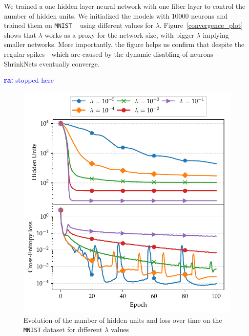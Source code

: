 \documentclass[sigconf]{acmart}
\newcommand{\ra}[1]{\textcolor{blue}{{\bf ra:} #1}}
\newcommand{\gl}[1]{\textcolor{violet}{{\bf Gl:} #1}}
\begin{document}
We trained a one hidden layer
neural network with one filter layer to control the number of hidden units. We
initialized the models with $10000$ neurons and trained them on \texttt{MNIST}
~\cite{Lecun1998} using different values for $\lambda$.
Figure~\autoref{convergence_plot} shows that
$\lambda$ works as a proxy for the network size,
with bigger $\lambda$ implying smaller
networks. More importantly, the figure helps us confirm that despite the regular
spikes---which are caused by the dynamic disabling of neurons---ShrinkNets
eventually converge.

\ra{stopped here}

\begin{figure}
\begin{center}
\includegraphics[width=0.9\columnwidth]{convergence}
\caption{Evolution of the number of hidden units and loss over time on the \texttt{MNIST} dataset for different $\lambda$ values \label{convergence_plot}}
\end{center}
\end{figure}
\end{document}
